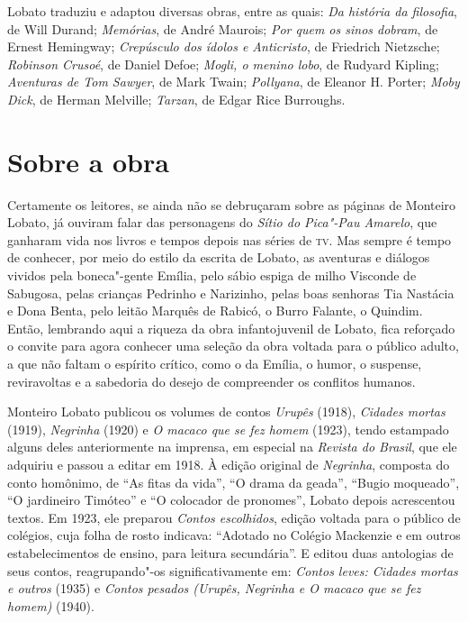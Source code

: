 Lobato traduziu e adaptou diversas obras, entre as quais: \emph{Da
história da filosofia}, de Will Durand; \emph{Memórias}, de André
Maurois; \emph{Por quem os sinos dobram}, de Ernest Hemingway;
\emph{Crepúsculo dos ídolos e Anticristo}, de Friedrich Nietzsche;
\emph{Robinson Crusoé}, de Daniel Defoe; \emph{Mogli, o menino lobo}, de
Rudyard Kipling; \emph{Aventuras de Tom Sawyer}, de Mark Twain;
\emph{Pollyana}, de Eleanor H. Porter; \emph{Moby Dick}, de Herman
Melville; \emph{Tarzan}, de Edgar Rice Burroughs.

\section{Sobre a obra}

Certamente os leitores, se ainda não se debruçaram sobre as páginas de
Monteiro Lobato, já ouviram falar das personagens do \emph{Sítio do
Pica"-Pau Amarelo}, que ganharam vida nos livros e tempos depois nas
séries de \textsc{tv}. Mas sempre é tempo de conhecer, por meio do estilo da
escrita de Lobato, as aventuras e diálogos vividos pela boneca"-gente
Emília, pelo sábio espiga de milho Visconde de Sabugosa, pelas crianças
Pedrinho e Narizinho, pelas boas senhoras Tia Nastácia e Dona Benta,
pelo leitão Marquês de Rabicó, o Burro Falante, o Quindim. Então,
lembrando aqui a riqueza da obra infantojuvenil de Lobato, fica
reforçado o convite para agora conhecer uma seleção da obra voltada para
o público adulto, a que não faltam o espírito crítico, como o da Emília,
o humor, o suspense, reviravoltas e a sabedoria do desejo de compreender
os conflitos humanos.

Monteiro Lobato publicou os volumes de contos \emph{Urupês} (1918),
\emph{Cidades mortas} (1919), \emph{Negrinha} (1920) e \emph{O macaco
que se fez homem} (1923), tendo estampado alguns deles anteriormente na
imprensa, em especial na \emph{Revista do Brasil}, que ele adquiriu e
passou a editar em 1918. À edição original de \emph{Negrinha}, composta
do conto homônimo, de ``As fitas da vida'', ``O drama da geada'',
``Bugio moqueado'', ``O jardineiro Timóteo'' e ``O colocador de
pronomes'', Lobato depois acrescentou textos. Em 1923, ele preparou
\emph{Contos escolhidos}, edição voltada para o público de colégios,
cuja folha de rosto indicava: ``Adotado no Colégio Mackenzie e em outros
estabelecimentos de ensino, para leitura secundária''. E editou duas
antologias de seus contos, reagrupando"-os significativamente em:
\emph{Contos leves: Cidades mortas e outros} (1935) e \emph{Contos
pesados (Urupês, Negrinha e O macaco que se fez homem)} (1940).


